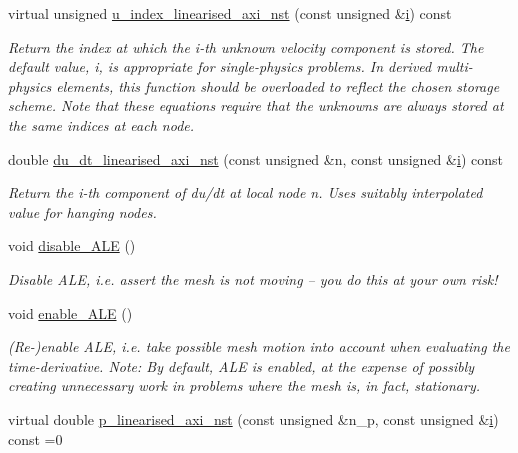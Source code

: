 \begin{DoxyCompactItemize}
virtual unsigned \hyperlink{classoomph_1_1LinearisedAxisymmetricNavierStokesEquations_ac8449bac35c1dc335a4815b3274d6509}{u\+\_\+index\+\_\+linearised\+\_\+axi\+\_\+nst} (const unsigned \&\hyperlink{cfortran_8h_adb50e893b86b3e55e751a42eab3cba82}{i}) const
\begin{DoxyCompactList}\small\item\em Return the index at which the i-\/th unknown velocity component is stored. The default value, i, is appropriate for single-\/physics problems. In derived multi-\/physics elements, this function should be overloaded to reflect the chosen storage scheme. Note that these equations require that the unknowns are always stored at the same indices at each node. \end{DoxyCompactList}\item 
double \hyperlink{classoomph_1_1LinearisedAxisymmetricNavierStokesEquations_a645183cd6e617b664cc47d59f3648461}{du\+\_\+dt\+\_\+linearised\+\_\+axi\+\_\+nst} (const unsigned \&n, const unsigned \&\hyperlink{cfortran_8h_adb50e893b86b3e55e751a42eab3cba82}{i}) const
\begin{DoxyCompactList}\small\item\em Return the i-\/th component of du/dt at local node n. Uses suitably interpolated value for hanging nodes. \end{DoxyCompactList}\item 
void \hyperlink{classoomph_1_1LinearisedAxisymmetricNavierStokesEquations_a64005c13adc728853af06891def5b9d7}{disable\+\_\+\+A\+LE} ()
\begin{DoxyCompactList}\small\item\em Disable A\+LE, i.\+e. assert the mesh is not moving -- you do this at your own risk! \end{DoxyCompactList}\item 
void \hyperlink{classoomph_1_1LinearisedAxisymmetricNavierStokesEquations_a843423bcd60e1dcb8693ea7c767f0a51}{enable\+\_\+\+A\+LE} ()
\begin{DoxyCompactList}\small\item\em (Re-\/)enable A\+LE, i.\+e. take possible mesh motion into account when evaluating the time-\/derivative. Note\+: By default, A\+LE is enabled, at the expense of possibly creating unnecessary work in problems where the mesh is, in fact, stationary. \end{DoxyCompactList}\item 
virtual double \hyperlink{classoomph_1_1LinearisedAxisymmetricNavierStokesEquations_aed0485a01052ffe2a5c9f36d6dd07da4}{p\+\_\+linearised\+\_\+axi\+\_\+nst} (const unsigned \&n\+\_\+p, const unsigned \&\hyperlink{cfortran_8h_adb50e893b86b3e55e751a42eab3cba82}{i}) const =0

\end{DoxyCompactItemize}
